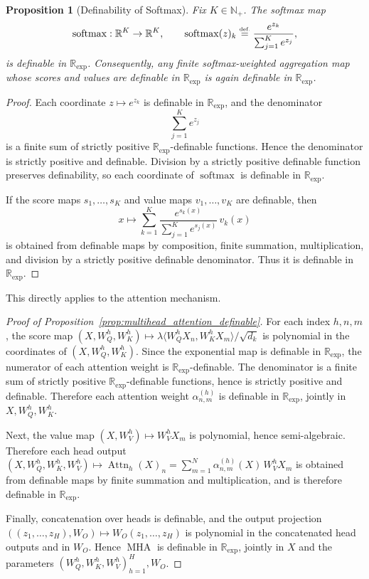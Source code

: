 \documentclass{article}
\newcommand{\eqdef}{\ensuremath{\stackrel{\mbox{\upshape\tiny def.}}{=}}}
\theoremstyle{plain}
\newtheorem{proposition}[theorem]{Proposition}
\theoremstyle{definition}
\theoremstyle{remark}
\theoremstyle{plain}
\numberwithin{thm}{section}
\theoremstyle{definition}
\numberwithin{equation}{section}
\begin{document}
\begin{proposition}[Definability of Softmax]
\label{prop:softmax_definable}
Fix $K\in\mathbb{N}_+$.  The softmax map
\[
    \operatorname{softmax}:\mathbb{R}^K\to\mathbb{R}^K,
    \qquad
    \operatorname{softmax}(z)_k
    \eqdef
    \frac{e^{z_k}}{\sum_{j=1}^K e^{z_j}},
\]
is definable in $\mathbb{R}_{\exp}$.  Consequently, any finite softmax-weighted
aggregation map whose scores and values are definable in $\mathbb{R}_{\exp}$ is
again definable in $\mathbb{R}_{\exp}$.
\end{proposition}

\begin{proof}
Each coordinate $z\mapsto e^{z_k}$ is definable in $\mathbb{R}_{\exp}$, and
the denominator
\[
    \sum_{j=1}^K e^{z_j}
\]
is a finite sum of strictly positive $\mathbb{R}_{\exp}$-definable functions.
Hence the denominator is strictly positive and definable.  Division by a
strictly positive definable function preserves definability, so each coordinate
of $\operatorname{softmax}$ is definable in $\mathbb{R}_{\exp}$.

If the score maps $s_1,\dots,s_K$ and value maps
$v_1,\dots,v_K$ are definable, then
\[
    x\mapsto
    \sum_{k=1}^K
    \frac{e^{s_k(x)}}{\sum_{j=1}^K e^{s_j(x)}}\,v_k(x)
\]
is obtained from definable maps by composition, finite summation,
multiplication, and division by a strictly positive definable denominator.
Thus it is definable in $\mathbb{R}_{\exp}$.
\end{proof}

This directly applies to the attention mechanism.

\begin{proof}[{Proof of Proposition~\ref{prop:multihead_attention_definable}}]
For each index $h,n,m$, the score map
$
    (X,W_Q^h,W_K^h)
    \mapsto
    \lambda\langle W_Q^hX_n,W_K^hX_m\rangle/\sqrt{d_k}
$
is polynomial in the coordinates of $(X,W_Q^h,W_K^h)$.  Since the exponential
map is definable in $\mathbb{R}_{\exp}$, the numerator of each attention weight
is $\mathbb{R}_{\exp}$-definable.  The denominator is a finite sum of strictly
positive $\mathbb{R}_{\exp}$-definable functions, hence is strictly positive
and definable.  Therefore each attention weight
$\alpha^{(h)}_{n,m}$ is definable in $\mathbb{R}_{\exp}$, jointly in
$X,W_Q^h,W_K^h$.

Next, the value map
$
    (X,W_V^h)\mapsto W_V^hX_m
$
is polynomial, hence semi-algebraic.  Therefore each head output
$
    (X,W_Q^h,W_K^h,W_V^h)
    \mapsto
    \operatorname{Attn}_h(X)_n
    =
    \sum_{m=1}^N
    \alpha^{(h)}_{n,m}(X)\,W_V^hX_m
$
is obtained from definable maps by finite summation and multiplication, and is
therefore definable in $\mathbb{R}_{\exp}$.

Finally, concatenation over heads is definable, and the output projection
$
    ((z_1,\dots,z_H),W_O)
    \mapsto
    W_O(z_1,\dots,z_H)
$
is polynomial in the concatenated head outputs and in $W_O$.  Hence
$\operatorname{MHA}$ is definable in $\mathbb{R}_{\exp}$, jointly in
$X$ and the parameters $(W_Q^h,W_K^h,W_V^h)_{h=1}^H,W_O$.
\end{proof}
\end{document}
